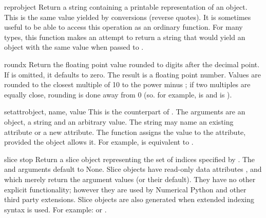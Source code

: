 \begin{funcdesc}{repr}{object}
  Return a string containing a printable representation of an object.
  This is the same value yielded by conversions (reverse quotes).
  It is sometimes useful to be able to access this operation as an
  ordinary function.  For many types, this function makes an attempt
  to return a string that would yield an object with the same value
  when passed to .
\end{funcdesc}

\begin{funcdesc}{round}{x}
  Return the floating point value  rounded to  digits
  after the decimal point.  If  is omitted, it defaults to zero.
  The result is a floating point number.  Values are rounded to the
  closest multiple of 10 to the power minus ; if two multiples
  are equally close, rounding is done away from 0 (so. for example,
   is  and  is ).
\end{funcdesc}

\begin{funcdesc}{setattr}{object, name, value}
  This is the counterpart of .  The arguments are an
  object, a string and an arbitrary value.  The string may name an
  existing attribute or a new attribute.  The function assigns the
  value to the attribute, provided the object allows it.  For example,
   is equivalent to
  .
\end{funcdesc}

\begin{funcdesc}{slice}{ stop}
  Return a slice object representing the set of indices specified by
  .  The 
  and  arguments default to None.  Slice objects have
  read-only data attributes ,  and
   which merely return the argument values (or their
  default).  They have no other explicit functionality; however they
  are used by Numerical Python and other third
  party extensions.  Slice objects are also generated when extended
  indexing syntax is used.  For example:  or
  .
\end{funcdesc}

